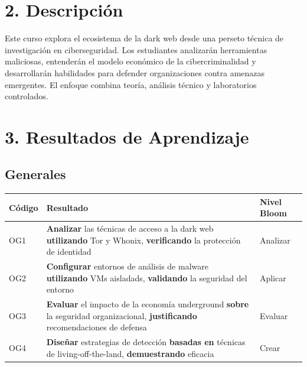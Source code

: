 \documentclass[
  letterpaper,
]{report}
\newcounter{none} %
\begin{document}
\section{2. Descripción}\label{descripciuxf3n}

Este curso explora el ecosistema de la dark web desde una perseto
técnica de investigación en ciberseguridad. Los estudiantes analizarán
herramientas maliciosas, entenderán el modelo económico de la
cibercriminalidad y desarrollarán habilidades para defender
organizaciones contra amenazas emergentes. El enfoque combina teoría,
análisis técnico y laboratorios controlados.

\section{3. Resultados de Aprendizaje}\label{resultados-de-aprendizaje}

\subsection{Generales}\label{generales}

{\def\LTcaptype{none} %
\begin{longtable}[]{@{}
  >{\raggedright\arraybackslash}p{}
  >{\raggedright\arraybackslash}p{}
  >{\raggedright\arraybackslash}p{}@{}}
\toprule\noalign{}
\begin{minipage}[b]{\linewidth}\raggedright
Código
\end{minipage} & \begin{minipage}[b]{\linewidth}\raggedright
Resultado
\end{minipage} & \begin{minipage}[b]{\linewidth}\raggedright
Nivel Bloom
\end{minipage} \\
\midrule\noalign{}
\endhead
\bottomrule\noalign{}
\endlastfoot
OG1 & \textbf{Analizar} las técnicas de acceso a la dark web
\textbf{utilizando} Tor y Whonix, \textbf{verificando} la protección de
identidad & Analizar \\
OG2 & \textbf{Configurar} entornos de análisis de malware
\textbf{utilizando} VMs aisladads, \textbf{validando} la seguridad del
entorno & Aplicar \\
OG3 & \textbf{Evaluar} el impacto de la economía underground
\textbf{sobre} la seguridad organizacional, \textbf{justificando}
recomendaciones de defensa & Evaluar \\
OG4 & \textbf{Diseñar} estrategias de detección \textbf{basadas en}
técnicas de living-off-the-land, \textbf{demuestrando} eficacia &
Crear \\
\end{longtable}
}
\end{document}
